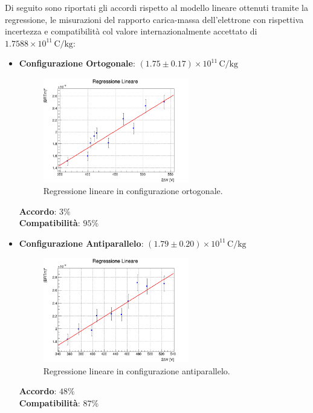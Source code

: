 \documentclass[a4paper,12pt]{article}
\begin{document}
Di seguito sono riportati gli accordi rispetto al modello lineare ottenuti tramite la regressione, le misurazioni del rapporto carica-massa dell’elettrone con rispettiva incertezza e compatibilità col valore internazionalmente accettato di \( 1.7588 \times 10^{11} \, \text{C/kg} \):

\begin{itemize}
    \item \textbf{Configurazione Ortogonale}: \( (1.75 \pm 0.17) \times 10^{11} \, \text{C/kg}\)
    \begin{figure}[H]
        \centering
        \includegraphics[width=0.6\textwidth]{regr_ortogonale.png}
        \caption{Regressione lineare in configurazione ortogonale.}
        \label{fig:regr_ortogonale}
    \end{figure}
    \textbf{Accordo}: \(3\%\) \\
    \textbf{Compatibilità}: \(95\%\)
    \vspace{0.5cm}

    \item \textbf{Configurazione Antiparallelo}: \( (1.79 \pm 0.20) \times 10^{11} \, \text{C/kg}\)
    \begin{figure}[H]
        \centering
        \includegraphics[width=0.6\textwidth]{regr_antiparallelo.png}
        \caption{Regressione lineare in configurazione antiparallelo.}
        \label{fig:regr_antiparallelo}
    \end{figure}
    \textbf{Accordo}: \(48\%\) \\
    \textbf{Compatibilità}: \(87\%\)
    \vspace{0.5cm}


\end{itemize}
\end{document}
